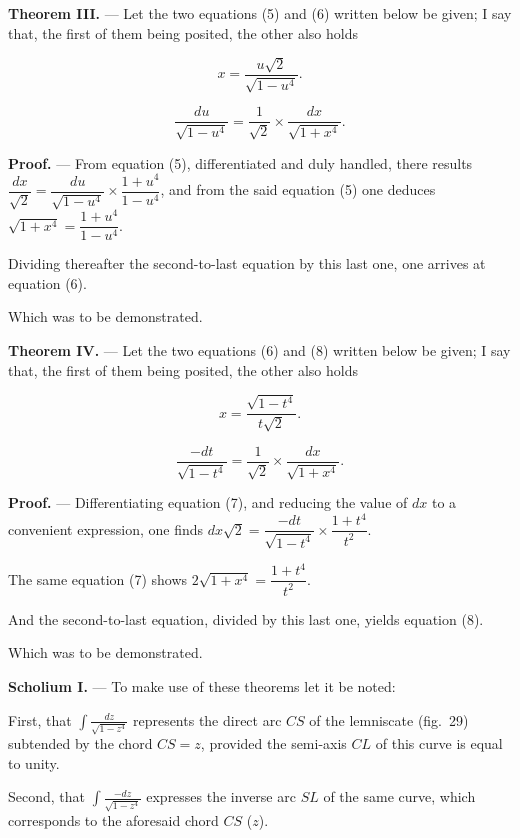 \documentclass{article}
\begin{document}
\textbf{Theorem III.} --- Let the two equations (5) and (6) written below be given; I say that,
the first of them being posited, the other also holds

\[ x = \frac{u\sqrt{2}}{\sqrt{1-u^{4}}}. \tag{5} \]

\[ \frac{du}{\sqrt{1-u^{4}}} = \frac{1}{\sqrt{2}}\times\frac{dx}{\sqrt{1+x^{4}}}. \tag{6} \]

\textbf{Proof.} --- From equation (5), differentiated and duly handled, there results
$\dfrac{dx}{\sqrt{2}} = \dfrac{du}{\sqrt{1-u^{4}}} \times \dfrac{1+u^{4}}{1-u^{4}}$, and from the
said equation (5) one deduces $\sqrt{1+x^{4}} = \dfrac{1+u^{4}}{1-u^{4}}$.

Dividing thereafter the second-to-last equation by this last one, one arrives at equation (6).

Which was to be demonstrated.

\textbf{Theorem IV.} --- Let the two equations (6) and (8) written below be given; I say that,
the first of them being posited, the other also holds

\[ x = \frac{\sqrt{1-t^{4}}}{t\sqrt{2}}. \tag{7} \]

\[ \frac{-dt}{\sqrt{1-t^{4}}} = \frac{1}{\sqrt{2}}\times\frac{dx}{\sqrt{1+x^{4}}}. \tag{8} \]

\textbf{Proof.} --- Differentiating equation (7), and reducing the value of $dx$ to a convenient
expression, one finds $dx\sqrt{2} = \dfrac{-dt}{\sqrt{1-t^{4}}} \times \dfrac{1+t^{4}}{t^{2}}$.

The same equation (7) shows $2\sqrt{1+x^{4}} = \dfrac{1+t^{4}}{t^{2}}$.

And the second-to-last equation, divided by this last one, yields equation (8).

Which was to be demonstrated.

\textbf{Scholium I.} --- To make use of these theorems let it be noted:

First, that $\displaystyle\int \frac{dz}{\sqrt{1-z^{4}}}$ represents the direct arc $CS$ of the
lemniscate (fig.~29) subtended by the chord $CS = z$, provided the semi-axis $CL$ of this curve
is equal to unity.


Second, that $\displaystyle\int \frac{-dz}{\sqrt{1-z^{4}}}$ expresses the inverse arc $SL$ of the
same curve, which corresponds to the aforesaid chord $CS$ ($z$).
\end{document}
